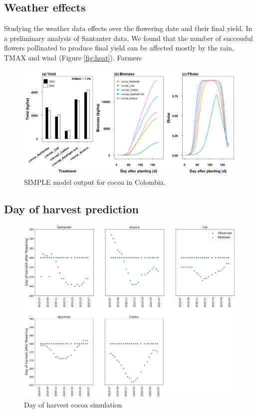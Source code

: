 \documentclass[gene,journal,article,submit,moreauthors,pdftex]{Definitions/mdpi}
\begin{document}
\subsection{Weather effects}
Studying the weather data effects over the flowering date and their final yield. In a preliminary analysis of Santanter data, We found that the number of successful flowers pollinated to produce final yield can be affected mostly by the rain, TMAX and wind (Figure \ref{fig:heat}). Farmers 


\begin{figure}[h!]
	\centering
	\includegraphics[scale=0.35]{images/outmodel.png}
	\caption{\footnotesize {SIMPLE model output for cocoa in Colombia.\\ }} 
	\label{fig:m1}
\end{figure}

\subsection{Day of harvest prediction}
\begin{figure}[h!]
	\centering
	\includegraphics[scale=0.4]{images/RegionHarvest2.png}
	\caption{\footnotesize {Day of harvest cocoa simulation\\ }} 
	\label{fig:dayH}
\end{figure}
\end{document}
